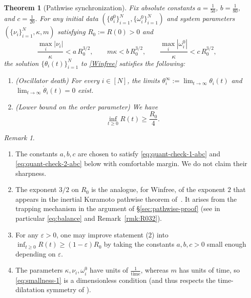 \documentclass[11pt,reqno]{amsart}
\newtheorem{theorem}[lemma]{Theorem}
\theoremstyle{definition}
\theoremstyle{remark}
\newtheorem{remark}[lemma]{Remark}
\begin{document}
\begin{theorem}[Pathwise synchronization]\label{thm:pathwise}
Fix absolute constants $a=\frac{1}{50}$, $b=\frac{1}{80}$, and $c=\frac{1}{20}$. For any initial data
$(\{\theta_i^0\}_{i=1}^N,\{\omega_i^0\}_{i=1}^N)$ and system parameters $(\{\nu_i\}_{i=1}^N,\kappa,m)$
satisfying $R_0:=R(0)>0$ and
\begin{equation}\label{eq:smallness-1}
\frac{\max_i |\nu_i|}{\kappa}<a\,R_0^{3/2},\qquad
m\kappa<b\,R_0^{3/2},\qquad
\frac{\max_i |\omega_i^0|}{\kappa}<c\,R_0^{3/2},
\end{equation}
the solution $\{\theta_i(t)\}_{i=1}^N$ to \eqref{Winfree} satisfies the following:
\begin{enumerate}
    \item (Oscillator death) For every $i\in[N]$, the limits
    $\theta_i^\infty:=\lim_{t\to\infty}\theta_i(t)$ and
    $\lim_{t\to\infty}\dot\theta_i(t)=0$ exist.
    \item (Lower bound on the order parameter) We have
    \[
    \inf_{t\ge 0}R(t)\ge\frac{R_0}{4}.
    \]
\end{enumerate}
\end{theorem}

\begin{remark}\,
\begin{enumerate}
	\item The constants $a,b,c$ are chosen to satisfy \eqref{eq:quant-check-1-abc} and \eqref{eq:quant-check-2-abc} below with comfortable margin. We do not claim their sharpness.
\item The exponent $3/2$ on $R_0$ is the analogue, for Winfree, of the
exponent $2$ that appears in the inertial Kuramoto pathwise theorem
of~\cite[Theorem 1.1]{cho2025quantitative}. It arises from the trapping mechanism in the argument of \S\ref{sec:pathwise-proof} (see in particular \eqref{eq:balance} and Remark~\ref{rmk:R032}).
\item For any $\varepsilon>0$,  one may improve statement (2) into $\inf_{t\ge 0}R(t)\ge (1-\varepsilon)R_0$ by taking the constants $a,b,c>0$ small enough depending on $\varepsilon$.
\item The parameters $\kappa, \nu_i, \omega_i^0$ have units of $\frac{1}{\mathrm{time}}$, whereas $m$ has units of $\mathrm{time}$, so \eqref{eq:smallness-1} is a dimensionless condition (and thus respects the time-dilatation symmetry of \cite[(2.7)]{cho2025quantitative}).
\end{enumerate}
\end{remark}
\end{document}
